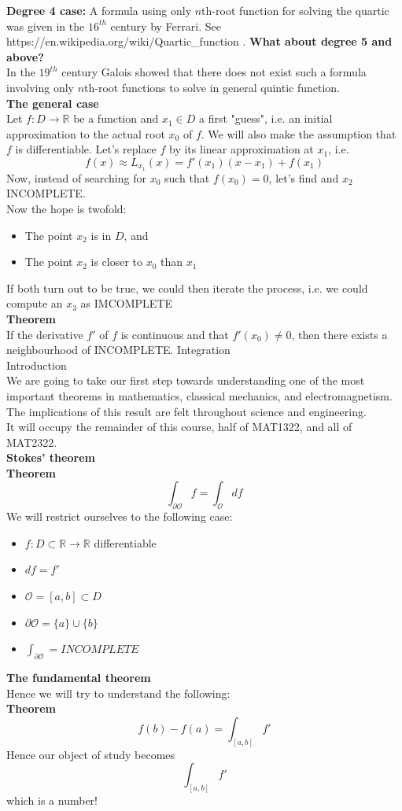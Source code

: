 \documentclass[]{article}
\begin{document}
	{\bf Degree 4 case:} A formula using only $n$th-root function for solving the quartic was given in the $16^{th}$ century by Ferrari. See https://en.wikipedia.org/wiki/Quartic\_function .
	{\bf What about degree 5 and above?}\\
	In the $19^{th}$ century Galois showed that there does not exist such a formula involving only $n$th-root functions to solve in general quintic function.\\
	{\bf The general case}\\
	Let $f:D\rightarrow\mathbb{R}$ be a function and $x_1\in D$ a first "guess", i.e. an initial approximation to the actual root $x_0$ of $f$. We will also make the assumption that $f$ is differentiable. Let's replace $f$ by its linear approximation at $x_1$, i.e.
	$$
		f(x)\approx L_{x_1}(x)=f'(x_1)(x-x_1)+f(x_1)
	$$
	Now, instead of searching for $x_0$ such that $f(x_0)=0$, let's find and $x_2$ INCOMPLETE.\\
	Now the hope is twofold:
	\begin{itemize}
		\item The point $x_2$ is in $D$, and
		\item The point $x_2$ is closer to $x_0$ than $x_1$
	\end{itemize}
	If both turn out to be true, we could then iterate the process, i.e. we could compute an $x_3$ as
	IMCOMPLETE\\
	{\bf Theorem}\\
	If the derivative $f'$ of $f$ is continuous and that $f'(x_0)\ne 0$, then there exists a neighbourhood of INCOMPLETE.
	\pagebreak
	\Large{Integration}\\
	\large{Introduction}\\
	\normalsize
	We are going to take our first step towards understanding one of the most important theorems in mathematics, classical mechanics, and electromagnetism.\\
	The implications of this result are felt throughout science and engineering.\\
	It will occupy the remainder of this course, half of MAT1322, and all of MAT2322.\\
	{\bf Stokes' theorem}\\
	{\bf Theorem}
	\Large$$
		\int_{\partial\mathcal{O}}f=\int_{\mathcal{O}}df
	$$
	\normalsize
	We will restrict ourselves to the following case:
	\begin{itemize}
		\item $f:D\subset\mathbb{R}\rightarrow\mathbb{R}$ differentiable
		\item $df=f'$
		\item $\mathcal{O}=[a,b]\subset D$
		\item $\partial\mathcal{O}=\{a\}\cup\{b\}$
		\item $\int_{\partial\mathcal{O}}=INCOMPLETE$
	\end{itemize}
	{\bf The fundamental theorem}\\
	Hence we will try to understand the following:\\
	{\bf Theorem}
	$$
		f(b)-f(a)=\int_{[a,b]}f'
	$$
	Hence our object of study becomes
	$$
		\int_{[a,b]}f'
	$$
	which is a number!\\
	
\end{document}
